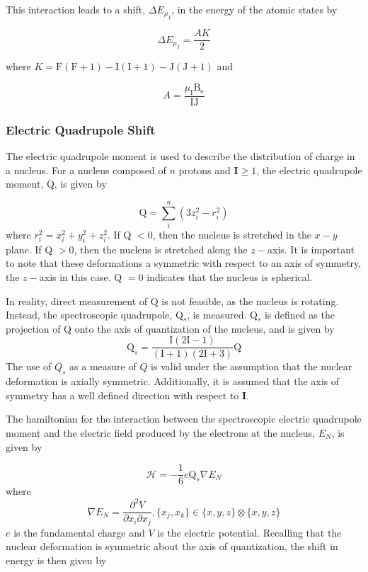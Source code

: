 \documentclass[12pt,a4paper,margin=1in]{report}
\begin{document}
This interaction leads to a shift, $\Delta E_{\mu_I}$, in the energy of the atomic states by

\begin{equation}
\Delta E_{\mu_I} = \frac{AK}{2}
\end{equation}

where $K = \mathrm{F(F+1) - I(I+1) - J(J+1)}$ and 

\begin{equation}
A = \frac{\mu_{\mathrm{I}}\mathrm{B_e}}{\mathrm{IJ}}
\end{equation}

\subsubsection*{Electric Quadrupole Shift}
The electric quadrupole moment is used to describe the distribution of charge in a nucleus. For a nucleus composed of $n$ protons and $\mathbf{I}\geq1$, the electric quadrupole moment, Q, is given by

\begin{equation}
\mathrm{Q} = \sum_i^n (3z_i^2-r_i^2)
\end{equation}
where $r_i^2 = x_i^2+y_i^2+z_i^2$. If Q $ < 0$, then the nucleus is stretched in the $x-y$ plane. If Q $ > 0$, then the nucleus is stretched along the $z-$axis. It is important to note that these deformations a symmetric with respect to an axis of symmetry, the $z-$axis in this case. Q $=0$ indicates that the nucleus is spherical. 

In reality, direct measurement of Q is not feasible, as the nucleus is rotating. Instead, the spectroscopic quadrupole, Q$_s$, is measured. Q$_s$ is defined as the projection of Q onto the axis of quantization of the nucleus, and is given by
\begin{equation}
\mathrm{Q}_s = \frac{\mathrm{I}(2\mathrm{I}-1)}{(\mathrm{I}+1)(2\mathrm{I}+3)}\mathrm{Q}
\end{equation}
The use of $Q_s$ as a measure of $Q$ is valid under the assumption that the nuclear deformation is axially symmetric. Additionally, it is assumed that the axis of symmetry has a well defined direction with respect to \textbf{I}.

The hamiltonian for the interaction between the spectroscopic electric quadrupole moment and the electric field produced by the electrons at the nucleus, $E_N$, is given by

\begin{equation}
\mathcal{H} = - \frac{1}{6}e\mathrm{Q}_s\nabla{E_N}
\end{equation}
where
\begin{equation}
\nabla{E_N} = \frac{\partial^2V}{\partial x_i\partial x_j}, \{x_j,x_k\} \in \{x,y,z\} \otimes \{x,y,z\}
\end{equation}
$e$ is the fundamental charge and $V$ is the electric potential. Recalling that the nuclear deformation is symmetric about the axis of quantization, the shift in energy is then given by
\end{document}
